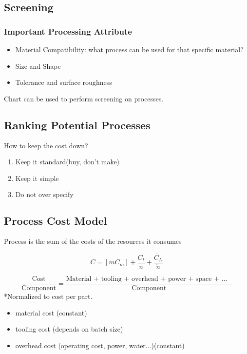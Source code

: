 \documentclass{article}
\begin{document}
        \subsection*{Screening}
        \subsubsection*{Important Processing Attribute}
        \begin{itemize}
            \item Material Compatibility: what process can be used for that specific material?
            \item Size and Shape
            \item Tolerance and surface roughness
        \end{itemize}
        Chart can be used to perform screening on processes.
        
        \subsection*{Ranking Potential Processes}
        How to keep the cost down?
        \begin{enumerate}
            \item Keep it standard(buy, don't make) 
            \item Keep it simple
            \item Do not over specify
        \end{enumerate}

        \subsection*{Process Cost Model}
        Process is the sum of the costs of the resources it consumes

        \begin{equation*}
            C = [mC_{m}] + \frac{C_{t}}{n} + \frac{\dot{C_{L}}}{\dot{n}}
        \end{equation*}

        \begin{equation*}
            \frac{\text{Cost}}{\text{Component}} = \frac{\text{Material + tooling + overhead + power + space + $\dots$ }}{\text{Component}}
        \end{equation*}
        *Normalized to cost per part.

        \begin{itemize}
            \item material cost (constant)
            \item tooling cost (depends on batch size)
            \item overhead cost (operating cost, power, water...)(constant)
        \end{itemize}
\end{document}
